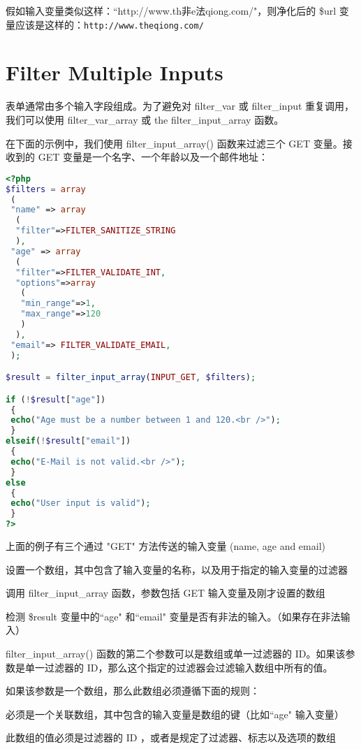 假如输入变量类似这样：``http://www.th非e法qiong.com/"，则净化后的 \$url 变量应该是这样的：\verb|http://www.theqiong.com/|


\section{Filter Multiple Inputs}


表单通常由多个输入字段组成。为了避免对 filter\_var 或 filter\_input 重复调用，我们可以使用 filter\_var\_array 或 the filter\_input\_array 函数。

在下面的示例中，我们使用 filter\_input\_array() 函数来过滤三个 GET 变量。接收到的 GET 变量是一个名字、一个年龄以及一个邮件地址：


\begin{lstlisting}[language=PHP]
<?php
$filters = array
 (
 "name" => array
  (
  "filter"=>FILTER_SANITIZE_STRING
  ),
 "age" => array
  (
  "filter"=>FILTER_VALIDATE_INT,
  "options"=>array
   (
   "min_range"=>1,
   "max_range"=>120
   )
  ),
 "email"=> FILTER_VALIDATE_EMAIL,
 );

$result = filter_input_array(INPUT_GET, $filters);

if (!$result["age"])
 {
 echo("Age must be a number between 1 and 120.<br />");
 }
elseif(!$result["email"])
 {
 echo("E-Mail is not valid.<br />");
 }
else
 {
 echo("User input is valid");
 }
?>
\end{lstlisting}


上面的例子有三个通过 "GET" 方法传送的输入变量 (name, age and email)

\begin{compactenum}
\item 设置一个数组，其中包含了输入变量的名称，以及用于指定的输入变量的过滤器
\item 调用 filter\_input\_array 函数，参数包括 GET 输入变量及刚才设置的数组
\item 检测 \$result 变量中的``age" 和``email" 变量是否有非法的输入。（如果存在非法输入）
\end{compactenum}

filter\_input\_array() 函数的第二个参数可以是数组或单一过滤器的 ID。如果该参数是单一过滤器的 ID，那么这个指定的过滤器会过滤输入数组中所有的值。

如果该参数是一个数组，那么此数组必须遵循下面的规则：

\begin{compactitem}
\item 必须是一个关联数组，其中包含的输入变量是数组的键（比如``age" 输入变量）
\item 此数组的值必须是过滤器的 ID ，或者是规定了过滤器、标志以及选项的数组
\end{compactitem}


